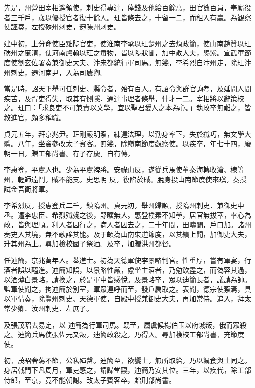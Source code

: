 \begin{pinyinscope}
 先是，州營田宰相遙領使，刺史得專達，俸錢及他給百餘萬，田官數百員，奉廝役者三千戶，歲以優授官者復十餘人。玨皆條去之，十留一二，而租入有贏。為觀察使誣奏，左授硤州刺史，遷陳州刺史。



 建中初，上分命使臣黜陟官吏，使淮南李承以玨楚州之去煩政簡，使山南趙贊以玨硤州之廉清，使河南盧翰以玨之肅物，皆以陟狀聞，加中散大夫，賜紫。宣武軍節度使劉玄佐署奏兼御史大夫、汴宋都統行軍司馬。無幾，李希烈自汴州走，除玨汴州刺史，遷河南尹，入為司農卿。



 當是時，詔天下舉可任刺史、縣令者，殆有百人。有詔令與群官詢考，及延問人間疾苦，及胥吏得失，取其有惻隱、通達事理者條舉，什才一二。宰相將以辭策校
 之。玨曰：「求良吏不可兼責以文學，宜以聖君愛人之本為心。」執政卒無難之，皆敘進官，頗多稱職。



 貞元五年，拜京兆尹。玨剛嚴明察，練達法理，以勤身率下，失於纖巧，無文學大體。八年，坐竇參改太子賓客。無幾，除嶺南節度觀察使。以疾卒，年七十四，廢朝一日，贈工部尚書。有子存慶，自有傳。



 李惠登，平盧人也。少為平盧裨將。安祿山反，遂從兵馬使董秦海轉收滄、棣等州，輕師遠鬥，賊不能支。史思明
 反，復陷於賊。脫身投山南節度使來瑱，奏授試金吾衛將軍。



 李希烈反，授惠登兵二千，鎮隋州。貞元初，舉州歸順，授隋州刺史、兼御史中丞。遭李忠臣、希烈殲殘之後，野曠無人。惠登樸素不知學，居官無拔萃，率心為政，皆與理順。利人者因行之，病人者因去之，二十年間，田疇闢，戶口加。諸州奏吏入其境，無不歌謠其能。及于頔為山南東道節度，以其績上聞，加御史大夫，升其州為上。尋加檢校國子祭酒。及卒，加贈洪州都督。



 任迪簡，京兆萬年人。舉進士。初為天德軍使李景略判官。性重厚，嘗有軍宴，行酒者誤以醯進。迪簡知誤，以景略性嚴，慮坐主酒者，乃勉飲盡之，而偽容其過，以酒薄白景略，請換之，於是軍中皆感悅。及景略卒，眾以迪簡長者，議請為帥。監軍使聞之，拘迪簡於別室，軍眾連呼而至，發戶扃取之。表聞，德宗使察焉，具以軍情奏，除豐州刺史、天德軍使，自殿中授兼御史大夫，再加常侍。追入，拜太常少卿、汝州刺史、左庶子。



 及張茂昭去易定，以
 迪簡為行軍司馬。既至，屬虞候楊伯玉以府城叛，俄而眾殺之。迪簡兵馬使張佐元又叛，迪簡政殺之，乃得入。尋加檢校工部尚書，充節度使。



 初，茂昭奢蕩不節，公私殫罄。迪簡至，欲饗士，無所取給，乃以糲食與士同之。身居戟門下凡周月，軍吏感之，請歸堂寢，迪簡乃安其位。三年，以疾代，除工部侍郎，至京，竟不能朝謝。改太子賓客卒，贈刑部尚書。




\end{pinyinscope}
